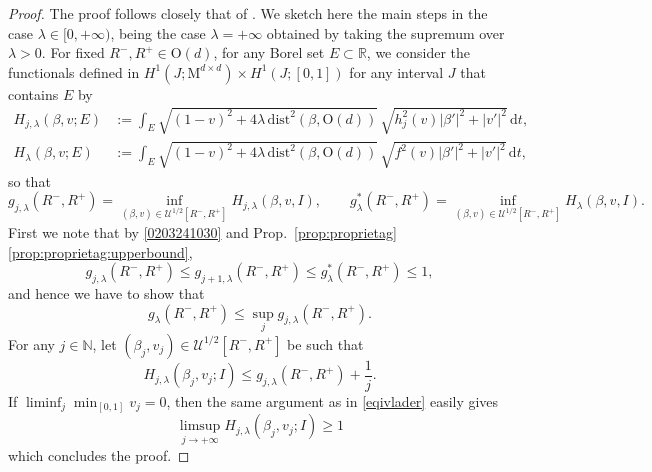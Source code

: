 \documentclass[a4paper,reqno]{amsart}
\newcommand\R{\mathbb{R}}
\newcommand\N{\mathbb{N}}
\newcommand\calU{\mathcal{U}}
\newcommand\dist{{\mathrm{dist}}}
\newcommand\dt{{\,\mathrm{d}t}}
\theoremstyle{remark}
\newcommand{\On}{\mathrm{O}(d)}
\newcommand{\Mno}{\mathrm{M}^{d\times d}}
\numberwithin{equation}{section}
\begin{document}
\begin{proof}
The proof follows closely that of \cite[Proposition~7.3 (iii)]{CFI14}.
We sketch here the main steps in the case $\lambda \in [0,+\infty)$, being the case $\lambda=+\infty$ obtained by  taking the supremum over $\lambda>0$.
For fixed $ R^-,R^+ \in \On$, for any Borel set $E\subset \R$,
we consider the functionals defined in $H^1(J;\Mno) \times  H^1(J;[0,1])$ for any interval $J$ that contains $E$ by
\begin{equation}\label{eqdefGjlambda}
\begin{split}
H_{j,\lambda} (\beta,v;E) &:=  \int_{E}  \sqrt{(1-v)^2 + 4\lambda \, \dist^2(\beta, \On)} \,\sqrt{h_j^2(v) |\beta'|^2+|v'|^2} \dt,
	\\
H_{\lambda} (\beta,v;E)& :=  \int_{E}  \sqrt{(1-v)^2 + 4\lambda \, \dist^2(\beta, \On)} \,\sqrt{f^2(v) |\beta'|^2+|v'|^2} \dt,
\end{split}
\end{equation}
so that %
\[
{g}_{j,\lambda}( R^-,R^+) = \inf_{(\beta,v)\in \calU^{1/2}[ R^-,R^+]}H_{j,\lambda}(\beta,v,I) , \qquad
{g}_{\lambda}^*( R^-,R^+) = \inf_{(\beta,v)\in\calU^{1/2}[ R^-,R^+]}H_{\lambda}(\beta,v,I).
	\]
First we note that by \eqref{0203241030} and Prop.~\ref{prop:proprietag}\ref{prop:proprietag:upperbound},
$$
{g}_{j,\lambda}( R^-,R^+)\leq {g}_{j+1,\lambda}( R^-,R^+)\leq g^*_\lambda( R^-,R^+)\leq 1,
$$
and hence we have to show that
\begin{equation}
	\label{eq-j-converse-ineq}
	{g}_{\lambda}( R^-,R^+)\leq \sup_j {g}_{j,\lambda}( R^-,R^+).
\end{equation}
	For any  $j\in\N$, let $(\beta_j,v_j) \in \calU^{1/2}[ R^-,R^+]$ be such that
	\begin{equation}\label{f:approx1}
		H_{j,\lambda} (\beta_j,v_j;I) \leq {g}_{j,\lambda}( R^-,R^+) +\frac 1j.
	\end{equation}
	If $\liminf_j \min_{[0,1]}v_j=0$, then
	the same argument as in \eqref{eqivlader} easily gives
	\begin{equation*}
\label{eq-converse-easy}
\limsup_{j\to +\infty} H_{j,\lambda}(\beta_j,v_j;I)\geq 1
	\end{equation*}
which concludes the proof.


\end{proof}
\end{document}
